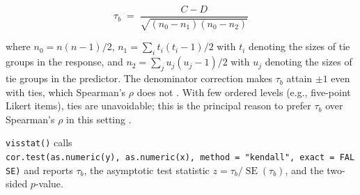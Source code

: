 \[\tau_b \;=\; \frac{C - D}
{\sqrt{\left(n_0 - n_1\right)\left(n_0 - n_2\right)}}\]

where \(n_0 = n(n-1)/2\), \(n_1 = \sum_i t_i(t_i-1)/2\) with \(t_i\) denoting
the sizes of tie groups in the response, and
\(n_2 = \sum_j u_j(u_j-1)/2\) with \(u_j\) denoting the sizes of tie groups
in the predictor.
The denominator correction makes \(\tau_b\) attain \(\pm 1\) even with ties, which Spearman's \(\rho\) does not \citep{Kendall:1945}.
With few ordered levels (e.g., five-point Likert items), ties are unavoidable; this is the principal reason to prefer \(\tau_b\) over Spearman's \(\rho\) in this setting \citep{Agresti:2010}.

\texttt{visstat()} calls \texttt{cor.test(as.numeric(y),\ as.numeric(x),\ method\ =\ "kendall",\ exact\ =\ FALSE)} and reports \(\tau_b\), the asymptotic test statistic
\(z = \tau_b / \operatorname{SE}(\tau_b)\), and the two-sided \(p\)-value.



\address{%
Sabine Schilling\\
Institute of Tourism and Mobility, Lucerne University of Applied Sciences and Arts\\%
6002 Lucerne, Switzerland\\
%
\url{https://github.com/shhschilling/visStatistics}\\%
\textit{ORCiD: \href{https://orcid.org/0000-0002-8318-9421}{0000-0002-8318-9421}}\\%
\href{mailto:sabineschilling@gmx.ch}{\nolinkurl{sabineschilling@gmx.ch}}%
}
